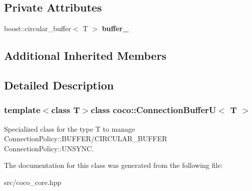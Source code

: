 \subsection*{Private Attributes}
\begin{DoxyCompactItemize}
\item 
\hypertarget{classcoco_1_1_connection_buffer_u_af9c42ab03e1318e1adebc63fd598415b}{}boost\+::circular\+\_\+buffer$<$ T $>$ {\bfseries buffer\+\_\+}\label{classcoco_1_1_connection_buffer_u_af9c42ab03e1318e1adebc63fd598415b}

\end{DoxyCompactItemize}
\subsection*{Additional Inherited Members}


\subsection{Detailed Description}
\subsubsection*{template$<$class T$>$class coco\+::\+Connection\+Buffer\+U$<$ T $>$}

Specialized class for the type T to manage Connection\+Policy\+::\+B\+U\+F\+F\+E\+R/\+C\+I\+R\+C\+U\+L\+A\+R\+\_\+\+B\+U\+F\+F\+E\+R Connection\+Policy\+::\+U\+N\+S\+Y\+N\+C. 

The documentation for this class was generated from the following file\+:\begin{DoxyCompactItemize}
\item 
src/coco\+\_\+core.\+hpp\end{DoxyCompactItemize}
